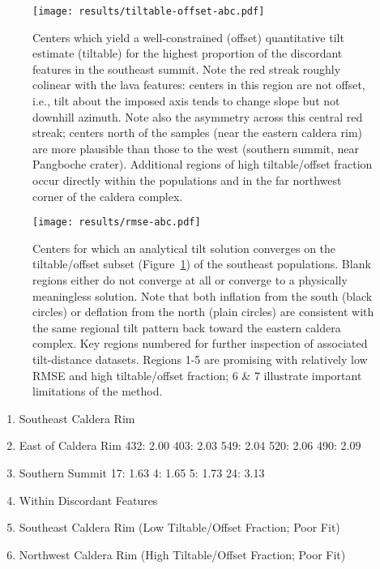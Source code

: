 \begin{figure}
    \texttt{[image: results/tiltable-offset-abc.pdf]}%
    \caption[Centers by tiltable/offset fraction]{Centers which yield a well-constrained (offset) quantitative tilt estimate (tiltable) for the highest proportion of the discordant features in the southeast summit. Note the red streak roughly colinear with the lava features: centers in this region are not offset, i.e., tilt about the imposed axis tends to change slope but not downhill azimuth. Note also the asymmetry across this central red streak; centers north of the samples (near the eastern caldera rim) are more plausible than those to the west (southern summit, near Pangboche crater). Additional regions of high tiltable/offset fraction occur directly within the populations and in the far northwest corner of the caldera complex.}%
    \label{fig:tiltable-offset-abc}
\end{figure}


\begin{figure}
    \texttt{[image: results/rmse-abc.pdf]}%
    \caption[Centers by analytical convergence]{Centers for which an analytical tilt solution converges on the tiltable/offset subset (Figure~\ref{fig:tiltable-offset-abc}) of the southeast populations. Blank regions either do not converge at all or converge to a physically meaningless solution. Note that both inflation from the south (black circles) or deflation from the north (plain circles) are consistent with the same regional tilt pattern back toward the eastern caldera complex. Key regions numbered for further inspection of associated tilt-distance datasets. Regions 1-5 are promising with relatively low \acs{RMSE} and high tiltable/offset fraction; 6 \& 7 illustrate important limitations of the method.}%
    \label{fig:rmse-abc}
\end{figure}

\begin{enumerate}
    \item Southeast Caldera Rim
    \item East of Caldera Rim
        432: 2.00
        403: 2.03
        549: 2.04
        520: 2.06
        490: 2.09
    \item Southern Summit
        17: 1.63 
        4: 1.65
        5: 1.73
        24: 3.13

    \item Within Discordant Features
    \item Southeast Caldera Rim (Low Tiltable/Offset Fraction; Poor Fit)
    \item Northwest Caldera Rim (High Tiltable/Offset Fraction; Poor Fit)
\end{enumerate}

